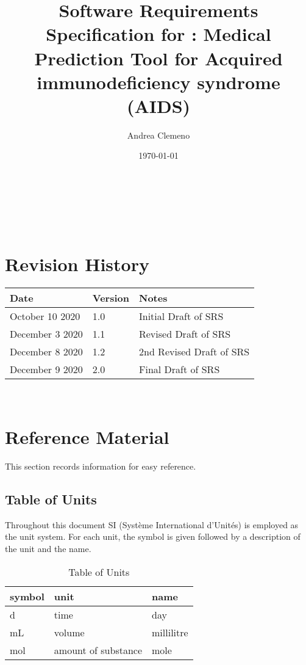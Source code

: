 \documentclass[12pt]{article}
\begin{document}
\title{Software Requirements Specification for \progname: Medical Prediction 
Tool for Acquired immunodeficiency syndrome (AIDS)} 
\author{Andrea Clemeno}
\date{\today}
	
\maketitle

~\newpage


\tableofcontents

~\newpage


\section*{Revision History}

\begin{tabularx}{\textwidth}{p{3cm}p{2cm}X}
\toprule {\bf Date} & {\bf Version} & {\bf Notes}\\
\midrule
October 10 2020 & 1.0 & Initial Draft of SRS\\
December 3 2020 & 1.1 & Revised Draft of SRS\\
December 8 2020 & 1.2 & 2nd Revised Draft of SRS\\
December 9 2020 & 2.0 & Final Draft of SRS\\
\bottomrule
\end{tabularx}

~\newpage

\section{Reference Material}

This section records information for easy reference.

\subsection{Table of Units}

Throughout this document SI (Syst\`{e}me International d'Unit\'{e}s) is employed
as the unit system. For each unit, the symbol is given followed by a
description of the unit and the name.

\renewcommand{\arraystretch}{1.2}
\begin{table}[h!]
\begin{center}
 \noindent \begin{tabular}{l l l}
    \toprule		
    \textbf{symbol} & \textbf{unit} & \textbf{name}\\
    \midrule 
    \si{\day} & time & day\\
    mL & volume	& millilitre\\
    \si{\mole} & amount of substance & mole\\
    \bottomrule
  \end{tabular}
  \end{center}
  	\caption{Table of Units}
\end{table}
\end{document}
